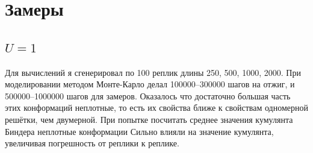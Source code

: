 \section{Замеры}

\subsection{$U = 1$}
Для вычислений я сгенерировал по 100 реплик длины 250, 500, 1000, 2000. При моделировании методом Монте-Карло делал 100000--300000 шагов на отжиг, и 500000--1000000 шагов для замеров. 
Оказалось что достаточно большая часть этих конформаций неплотные, то есть их свойства ближе к свойствам одномерной решётки, чем двумерной. При попытке посчитать среднее значения кумулянта Биндера неплотные конформации Сильно влияли на значение кумулянта, увеличивая погрешность от реплики к реплике.

